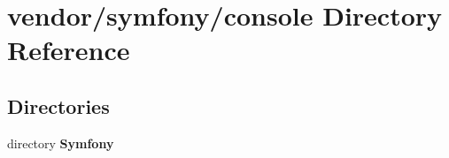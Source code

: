 \section{vendor/symfony/console Directory Reference}
\label{dir_ce4031f629a67899bbb0bf21890adf8b}
\subsection*{Directories}
\begin{DoxyCompactItemize}
\item 
directory {\bf Symfony}
\end{DoxyCompactItemize}
